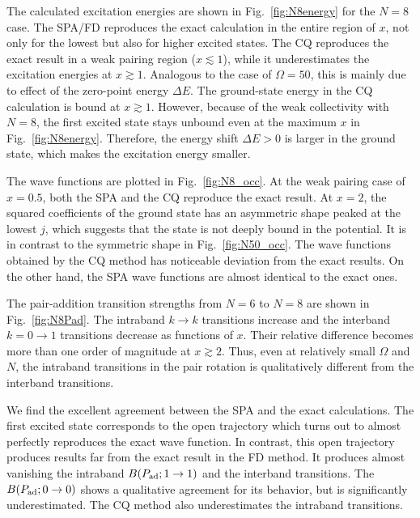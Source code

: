 \documentclass[%
superscriptaddress,
preprint,
showpacs,
nofootinbib,
amsmath,amssymb,
aps,
prc,
floatfix ]%
{revtex4-1}
\begin{document}
The calculated excitation energies are shown in Fig.~\ref{fig:N8energy}
for the $N=8$ case.
The SPA/FD reproduces the exact calculation in the entire region of $x$,
not only for the lowest but also for higher excited states.
The CQ reproduces the exact result in a weak pairing region ($x\lesssim 1$),
while it underestimates the excitation energies at $x\gtrsim 1$.
Analogous to the case of $\Omega=50$,
this is mainly due to effect of the zero-point energy $\Delta E$.
The ground-state energy in the CQ calculation 
is bound at $x\gtrsim 1$.
However, because of the weak collectivity with $N=8$,
the first excited state stays unbound even at the maximum $x$ in 
Fig.~\ref{fig:N8energy}.
Therefore, the energy shift $\Delta E>0$ is larger in the ground state,
which makes the excitation energy smaller.

The wave functions are plotted in Fig.~\ref{fig:N8_occ}. 
At the weak pairing case of $x=0.5$,
both the SPA and the CQ reproduce the exact result.
At $x=2$, the squared coefficients of the ground state has an
asymmetric shape peaked at the
lowest $j$, which suggests that the state is not deeply bound in the
potential.
It is in contrast to the symmetric shape in Fig.~\ref{fig:N50_occ}.
The wave functions obtained by the CQ method has noticeable deviation
from the exact results.
On the other hand, the SPA wave functions are almost identical to the
exact ones.



The pair-addition transition strengths from $N=6$ to $N=8$ are
shown in Fig.~\ref{fig:N8Pad}.
The intraband $k\rightarrow k$ transitions increase and 
the interband $k=0\rightarrow 1$ transitions decrease as
functions of $x$.
Their relative difference becomes
more than one order of magnitude at $x\gtrsim 2$.
Thus, even at relatively small $\Omega$ and $N$,
the intraband transitions in the pair rotation is qualitatively different
from the interband transitions.

We find the excellent agreement between the SPA and the exact calculations.
The first excited state corresponds to the open trajectory which
turns out to almost perfectly reproduces the exact wave function.
In contrast, this open trajectory produces results far from the exact
result in the FD method.
It produces almost vanishing the intraband
$B(P_{\rm ad}; 1\rightarrow 1)$ and the interband transitions.
The $B(P_{\rm ad}; 0\rightarrow 0)$ shows a qualitative agreement for
its behavior, but is significantly underestimated.
The CQ method also underestimates the intraband transitions.
\end{document}
